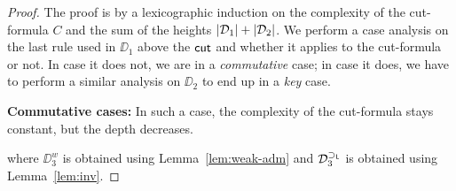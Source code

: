 	\begin{proof}
		The proof is by a lexicographic induction on the complexity of the cut-formula $C$ and the sum of the heights $|\mathcal{D}_1|+|\mathcal{D}_2|$.
		We perform a case analysis on the last rule used in $\DD_1$ above the $\mathsf{cut}$ and whether it applies to the cut-formula or not.
		In case it does not, we are in a \emph{commutative} case; in case it does, we have to perform a similar analysis on $\DD_2$ to end up in a \emph{key} case.
		
		\textbf{Commutative cases:}\label{commutative-cases}
		In such a case, the complexity of the cut-formula stays constant, but the depth decreases.
		
		\begin{smallequation*}
	\reducesto
\end{smallequation*}

\begin{smallequation*}\hspace*{-3.5em}
\end{smallequation*}

where $\DD_3^{w}$ is obtained using Lemma~\ref{lem:weak-adm} and $\mathcal{D}_3^{\mathsf{\mathbin{\supset}}_{\mathsf{L}}}$ is obtained using Lemma~\ref{lem:inv}.


\end{proof}
